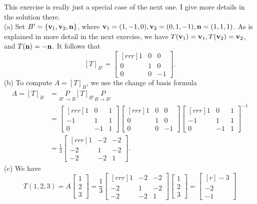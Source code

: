 \begin{solution}
\noindent
This exercise is really just a special case of the next one. I give more details in the solution there. 
\\
(a) Set $B'=\{{\mathbf v}_1, {\mathbf v}_2, {\mathbf n}\}$, where ${\mathbf v}_1=(1,-1,0), {\mathbf v}_2=(0,1,-1), {\mathbf n}=(1,1,1)$. As is explained in more detail in the next exercise, we have $T({\mathbf v}_1)={\mathbf v}_1, T({\mathbf v}_2)={\mathbf v}_2$, and $T({\mathbf n})=-{\mathbf n}$. It follows that 
\[
[T]_{B'}=\begin{bmatrix}[rrr]
1&0&0\\
0&1&0\\
0&0&-1
\end{bmatrix}.
\]
(b) To compute $A=[T]_B$, we use the change of basis formula 
\begin{align*}
A=[T]_B&=\underset{B'\rightarrow B}{P}[T]_{B'}\underset{B\rightarrow B'}{P}\\
&=\begin{bmatrix}[rrr]
1&0&1\\
-1&1&1\\
0&-1&1
\end{bmatrix}
\begin{bmatrix}[rrr]
1&0&0\\
0&1&0\\
0&0&-1
\end{bmatrix}
\begin{bmatrix}[rrr]
1&0&1\\
-1&1&1\\
0&-1&1
\end{bmatrix}^{-1}\\
&=\frac{1}{3}
\begin{bmatrix}[rrr]
1&-2&-2\\
-2&1&-2\\
-2&-2&1
\end{bmatrix}.
\end{align*}
(c) We have 
\[
T(1,2,3)=A\begin{bmatrix}
1\\ 2\\ 3
\end{bmatrix}=\frac{1}{3}
\begin{bmatrix}[rrr]
1&-2&-2\\
-2&1&-2\\
-2&-2&1
\end{bmatrix}
\begin{bmatrix}
1\\ 2\\ 3
\end{bmatrix}
=\begin{bmatrix}[r]
-3\\ -2\\ -1
\end{bmatrix}
\]
\end{solution}

